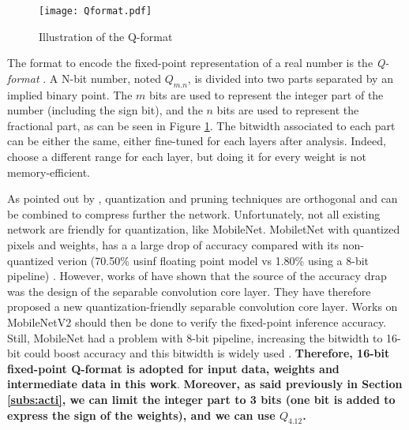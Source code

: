 \begin{figure}
    \centering
    \texttt{[image: Qformat.pdf]}
    \caption{Illustration of the Q-format}
    \label{fig:Qformat}
\end{figure}
%
The format to encode the fixed-point representation of a real number is the \textit{Q-format} \cite{ward_real-time_2001}. A N-bit number, noted $Q_{m.n}$, is divided into two parts separated by an implied binary point. The $m$ bits are used to represent the integer part of the number (including the sign bit), and the $n$ bits are used to represent the fractional part, as can be seen in Figure \ref{fig:Qformat}. The bitwidth associated to each part can be either the same, either fine-tuned for each layers after analysis. Indeed, \textcite{qiu_going_2016, yin_high_2018} choose a different range for each layer, but doing it for every weight is not memory-efficient.

As pointed out by \textcite{han_deep_2016}, quantization and pruning techniques are orthogonal and can be combined to compress further the network. Unfortunately, not all existing network are friendly for quantization, like MobileNet. MobiletNet with quantized pixels and weights, has a a large drop of accuracy compared with its non-quantized verion (70.50\% usinf floating point model vs 1.80\% using a 8-bit pipeline) \cite{sheng_quantization-friendly_2018}. However, works of \textcite{sheng_quantization-friendly_2018} have shown that the source of the accuracy drap was the design of the separable convolution core layer. They have therefore proposed a new quantization-friendly separable convolution core layer. Works on MobileNetV2 should then be done to verify the fixed-point inference accuracy. Still, MobileNet had a problem with 8-bit pipeline, increasing the bitwidth to 16-bit could boost accuracy \cite{cheng_recent_2018} and this bitwidth is widely used \cite{huimin_li_high_2016, bai_cnn_2018}. \textbf{Therefore, 16-bit fixed-point Q-format is adopted for input data, weights and intermediate data in this work}. \textbf{Moreover, as said previously in Section \ref{subs:acti}, we can limit the integer part to 3 bits (one bit is added to express the sign of the weights), and we can use $Q_{4.12}$.}

